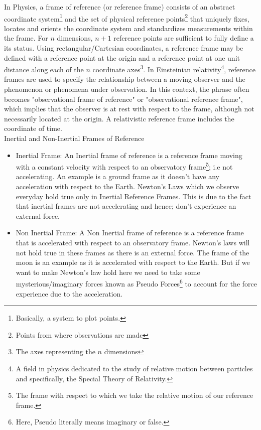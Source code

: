 \begin{phybox}{}
{In Physics, a frame of reference (or reference frame) consists of an abstract coordinate system\footnote{Basically, a system to plot points.} and the set of physical reference points\footnote{Points from where observations are made} that uniquely fixes, locates and orients the coordinate system and standardizes measurements within the frame.
For $n$ dimensions, $n+1$ reference points are sufficient to fully define a its status. Using rectangular/Cartesian coordinates, a reference frame may be defined with a reference point at the origin and a reference point at one unit distance along each of the $n$ coordinate axes\footnote{The axes representing the $n$ dimensions}.
In Einsteinian relativity\footnote{A field in physics dedicated to the study of relative motion between particles and specifically, the Special Theory of Relativity.}, reference frames are used to specify the relationship between a moving observer and the phenomenon or phenomena under observation. In this context, the phrase often becomes "observational frame of reference" or "observational reference frame", which implies that the observer is at rest with respect to the frame, although not necessarily located at the origin. A relativistic reference frame includes the coordinate  of time.\\
Inertial and Non-Inertial Frames of Reference
\begin{itemize}
    \item{Inertial Frame: An Inertial frame of reference is a reference frame moving with a constant velocity with respect to an observatory frame\footnote{The frame with respect to which we take the relative motion of our reference frame.}; i.e not accelerating. An example is a ground frame as it doesn't have any acceleration with respect to the Earth. Newton's Laws which we observe everyday hold true only in Inertial Reference Frames. This is due to the fact that inertial frames are not accelerating and hence; don't experience an external force.}
    \item{Non Inertial Frame: A Non Inertial frame of reference is a reference frame that is accelerated with respect to an observatory frame. Newton’s laws will not hold true in these frames as there is an external force. The frame of the moon is an example as it is accelerated with respect to the Earth. But if we want to make Newton’s law hold here we need to take some mysterious/imaginary forces known as Pseudo Forces\footnote{Here, Pseudo literally means imaginary or false.} to account for the force experience due to the acceleration.}
\end{itemize}}
\end{phybox}
